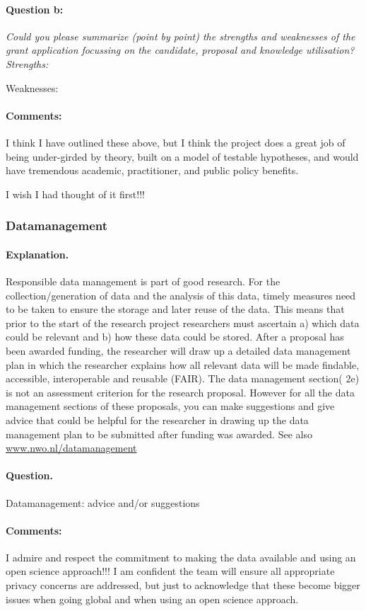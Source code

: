 \documentclass[twocolumn, serif, rga, numeric]{jote-article}
\begin{document}
\paragraph{Question b:}
\textit{Could you please summarize (point by point) the strengths and weaknesses of the grant application focussing on the candidate, proposal and knowledge utilisation? Strengths:}

\noindent Weaknesses:
\paragraph{Comments:}
I think I have outlined these above, but I think the project does a great job of being under-girded by theory, built on a model of testable hypotheses, and would have tremendous academic, practitioner, and public policy benefits.


I wish I had thought of it first!!!
 {}\subsubsection*{Datamanagement} 
\paragraph{Explanation.}
Responsible data management is part of good research. For the collection/generation of data and the analysis of this data, timely measures need to be taken to ensure the storage and later reuse of the data. This means that prior to the start of the research project researchers must ascertain a) which data could be relevant and b) how these data could be stored. After a proposal has been awarded funding, the researcher will draw up a detailed data management plan in which the researcher explains how all relevant data will be made findable, accessible, interoperable and reusable (FAIR). The data management section( 2e) is not an assessment criterion for the research proposal. However for all the data management sections of these proposals, you can make suggestions and give advice that could be helpful for the researcher in drawing up the data management plan to be submitted after funding was awarded. See also \href{www.nwo.nl/datamanagement}{www.nwo.nl/datamanagement}
\paragraph{Question.}
Datamanagement: advice and/or suggestions
\paragraph{Comments:}
I admire and respect the commitment to making the data available and using an open science approach!!!
I am confident the team will ensure all appropriate privacy concerns are addressed, but just to acknowledge that these become bigger issues when going global and when using an open science approach.
\end{document}
